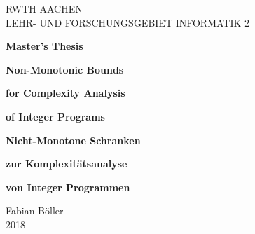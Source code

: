 \documentclass{masterthesis}
\begin{document}
\begin{titlepage}

\thispagestyle{empty}

\begin{center}
  
  {\huge RWTH AACHEN\\[5mm]}
  LEHR- UND FORSCHUNGSGEBIET INFORMATIK 2\\
  
  \vspace*{3cm}
  
  {\huge \textbf{Master's Thesis}}\\ 
  
  \vspace{3cm}

  {\LARGE \textbf{Non-Monotonic Bounds}}\\ 

  \vspace*{3mm}

  {\LARGE \textbf{for Complexity Analysis}}\\ 

  \vspace*{3mm}

  {\LARGE \textbf{of Integer Programs}}\\

  \vspace{2cm}
  
  {\LARGE \textbf{Nicht-Monotone Schranken}}\\ 

  \vspace*{3mm}

  {\LARGE \textbf{zur Komplexitätsanalyse}}\\ 

  \vspace*{3mm}

  {\LARGE \textbf{von Integer Programmen}}\\
  
  \vspace{6cm}
  
  {\huge Fabian Böller}\\[1cm]
  
  {\huge 2018}

\end{center}

\end{titlepage}
\end{document}
